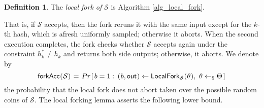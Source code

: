 \documentclass[10pt, psamsfonts, reqno]{amsart}
\theoremstyle{definition}
\newtheorem{defn}[thm]{Definition}
\theoremstyle{remark}
\numberwithin{equation}{section}
\begin{document}
\begin{defn}\label{def_local_fork}
The \textit{local fork of} $\mathcal{S}$ is
Algorithm \ref{alg_local_fork}.
\end{defn}

\noindent
That is, if $\mathcal{S}$ accepts, then
the fork reruns it with the same input except
for the $k$-th hash, which is
afresh uniformly sampled; otherwise it aborts.
When the second execution completes, the fork checks
whether $\mathcal{S}$ accepts again under the constraint
$h_k^* \neq h_k$ and returns both side outputs;
otherwise, it aborts. We denote by
\vspace{5pt}
\begin{equation}\label{local_forking_forkacc}
\mathsf{forkAcc}
\hspace{0.3pt}
(
	\hspace{0.3pt}
	\mathcal{S}
	\hspace{0.3pt}
)
\hspace{1pt}
=
\hspace{1pt}
Pr\hspace{1pt}[\hspace{1.5pt}b = 1 :
\hspace{2pt}(
	\hspace{0.5pt}
	b,
	\mathsf{out}
	\hspace{0.5pt}
)
\leftarrow
\mathsf{LocalFork}_{\mathcal{S}}
	\hspace{0.3pt}(
	\hspace{0.3pt}
	\theta
	\hspace{0.3pt}
),
\ \theta \leftarrow_\$ \Theta
\hspace{1.5pt}]\hspace{1pt}
\vspace{8pt}
\end{equation}
the probability that the local fork does not abort
taken over the possible random coins of $\mathcal{S}$.
The local forking lemma asserts the following lower bound.
\end{document}
